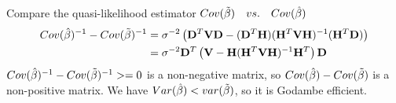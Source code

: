 Compare the quasi-likelihood estimator $ Cov( \Tilde{\beta}) \quad vs. \quad Cov( \hat{\beta})$
\begin{align*}
 Cov( \hat{\beta})^{-1} - Cov( \Tilde{\beta})^{-1} &= \sigma^{-2} \left(\mathbf{D}^T \mathbf{V} \mathbf{D} - (\mathbf{D}^T \mathbf{H})  (\mathbf{H}^T \mathbf{V} \mathbf{H}) ^{-1} (\mathbf{H}^T\mathbf{D}) \right)\\
 &=\sigma^{-2} \mathbf{D}^T \left( \mathbf{V} - \mathbf{H} (\mathbf{H}^T \mathbf{V} \mathbf{H}) ^{-1} \mathbf{H}^T \right)   \mathbf{D}
\end{align*} 
$ Cov( \hat{\beta})^{-1} - Cov( \Tilde{\beta})^{-1} >= 0$ is a non-negative matrix, so $ Cov( \hat{\beta}) - Cov( \Tilde{\beta})$ is a non-positive matrix. We have $Var(\hat{\beta}) < var(\Tilde{\beta})$, so it is Godambe efficient.